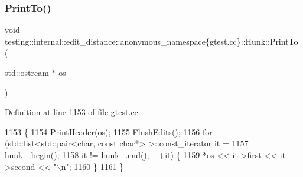 \subsubsection{\texorpdfstring{Print\+To()}{PrintTo()}}
{\footnotesize\ttfamily void testing\+::internal\+::edit\+\_\+distance\+::anonymous\+\_\+namespace\{gtest.\+cc\}\+::Hunk\+::\+Print\+To (\begin{DoxyParamCaption}\item[{std\+::ostream $\ast$}]{os }\end{DoxyParamCaption})\hspace{0.3cm}{\ttfamily [inline]}}



Definition at line 1153 of file gtest.\+cc.


\begin{DoxyCode}
1153                                \{
1154     \hyperlink{classtesting_1_1internal_1_1edit__distance_1_1anonymous__namespace_02gtest_8cc_03_1_1Hunk_a5752d6e583b7363218a4c61ffdbffb63}{PrintHeader}(os);
1155     \hyperlink{classtesting_1_1internal_1_1edit__distance_1_1anonymous__namespace_02gtest_8cc_03_1_1Hunk_a8279c19ffd74766256c2aec97cd25378}{FlushEdits}();
1156     \textcolor{keywordflow}{for} (std::list<std::pair<char, const char*> >::const\_iterator it =
1157              \hyperlink{classtesting_1_1internal_1_1edit__distance_1_1anonymous__namespace_02gtest_8cc_03_1_1Hunk_a212b858a6076f325fd6544dd35290761}{hunk\_}.begin();
1158          it != \hyperlink{classtesting_1_1internal_1_1edit__distance_1_1anonymous__namespace_02gtest_8cc_03_1_1Hunk_a212b858a6076f325fd6544dd35290761}{hunk\_}.end(); ++it) \{
1159       *os << it->first << it->second << \textcolor{stringliteral}{"\(\backslash\)n"};
1160     \}
1161   \}
\end{DoxyCode}
\mbox{\label{classtesting_1_1internal_1_1edit__distance_1_1anonymous__namespace_02gtest_8cc_03_1_1Hunk_aa4203a217bfcb6f4ccff08eda70975d3}} 
